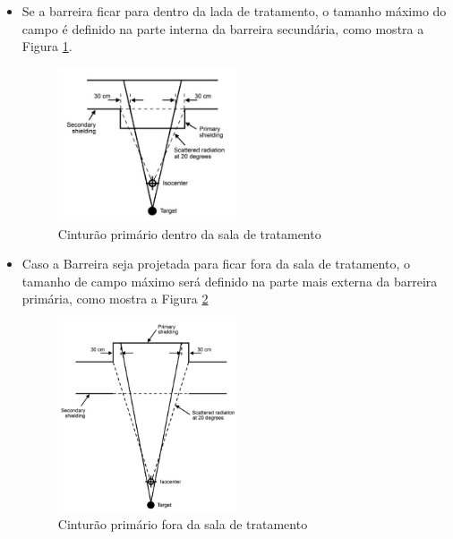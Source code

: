 \documentclass[11pt,a4paper]{article}
\begin{document}
            \begin{itemize}
                \item Se a barreira ficar para dentro da lada de tratamento, o tamanho máximo do campo é definido na parte interna da barreira secundária, como mostra a Figura \ref{fig:esquemaCinturaoPrimarioDentroDaSala}. 
                
                    \begin{figure}[h]
                        \centering
                        \includegraphics[width=0.5\textwidth]{Imagens/esquemaCinturaoPrimarioDentroDaSala.JPG}
                        \caption{Cinturão primário dentro da sala de tratamento}
                        \label{fig:esquemaCinturaoPrimarioDentroDaSala}
                    \end{figure}


                \item Caso a Barreira seja projetada para ficar fora da sala de tratamento, o tamanho de campo máximo será definido na parte mais externa da barreira primária, como mostra a Figura \ref{fig:esquemaCinturaoPrimarioForaDaSala}
                
                    \begin{figure}[h]
                        \centering
                        \includegraphics[width=0.5\textwidth]{Imagens/esquemaCinturaoPrimarioForaDaSala.JPG}
                        \caption{Cinturão primário fora da sala de tratamento}
                        \label{fig:esquemaCinturaoPrimarioForaDaSala}
                    \end{figure}


\end{itemize}
\end{document}
